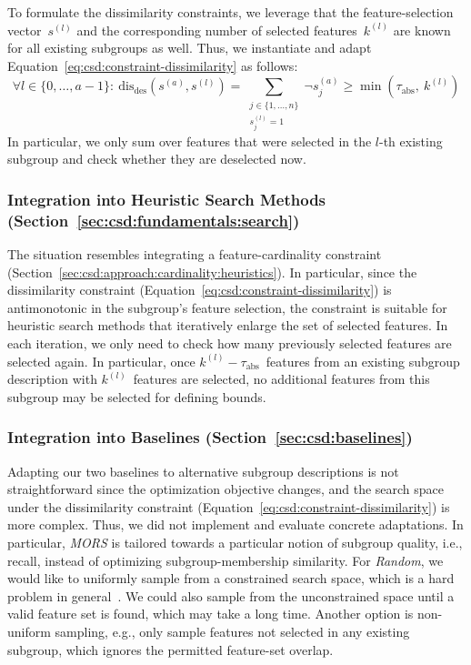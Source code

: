 \documentclass[acmsmall]{acmart} %
\theoremstyle{acmplain}
\theoremstyle{acmdefinition}
\begin{document}
To formulate the dissimilarity constraints, we leverage that the feature-selection vector~$s^{(l)}$ and the corresponding number of selected features~$k^{(l)}$ are known for all existing subgroups as well.
Thus, we instantiate and adapt Equation~\ref{eq:csd:constraint-dissimilarity} as follows:
%
\begin{equation}
	\forall l \in \{0, \dots, a-1\}:~ \text{dis}_{\text{des}}(s^{(a)}, s^{(l)}) = \sum_{\substack{j \in \{1, \dots, n\} \\ s^{(l)}_j = 1}} \lnot s^{(a)}_j \geq \min \left( \tau_{\text{abs}},~k^{(l)} \right)
	\label{eq:csd:smt-constraint-dissimilarity}
\end{equation}
%
In particular, we only sum over features that were selected in the $l$-th existing subgroup and check whether they are deselected now.

\subsubsection{Integration into Heuristic Search Methods (Section~\ref{sec:csd:fundamentals:search})}
\label{sec:csd:approach:alternatives:heuristics}

The situation resembles integrating a feature-cardinality constraint (Section~\ref{sec:csd:approach:cardinality:heuristics}).
In particular, since the dissimilarity constraint (Equation~\ref{eq:csd:constraint-dissimilarity}) is antimonotonic in the subgroup's feature selection, the constraint is suitable for heuristic search methods that iteratively enlarge the set of selected features.
In each iteration, we only need to check how many previously selected features are selected again.
In particular, once $k^{(l)} - \tau_{\text{abs}}$~features from an existing subgroup description with $k^{(l)}$~features are selected, no additional features from this subgroup may be selected for defining bounds.

\subsubsection{Integration into Baselines (Section~\ref{sec:csd:baselines})}
\label{sec:csd:approach:alternatives:baselines}

Adapting our two baselines to alternative subgroup descriptions is not straightforward since the optimization objective changes, and the search space under the dissimilarity constraint (Equation~\ref{eq:csd:constraint-dissimilarity}) is more complex.
Thus, we did not implement and evaluate concrete adaptations.
In particular, \emph{MORS} is tailored towards a particular notion of subgroup quality, i.e., recall, instead of optimizing subgroup-membership similarity.
For \emph{Random}, we would like to uniformly sample from a constrained search space, which is a hard problem in general~\cite{ermon2012uniform}.
We could also sample from the unconstrained space until a valid feature set is found, which may take a long time.
Another option is non-uniform sampling, e.g., only sample features not selected in any existing subgroup, which ignores the permitted feature-set overlap.
\end{document}
